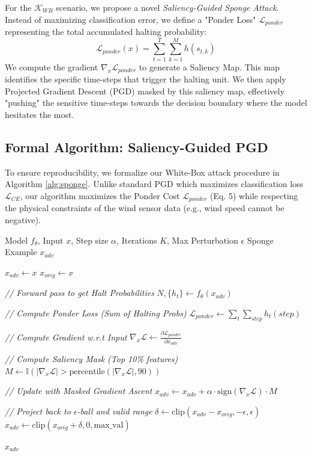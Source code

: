 \documentclass[conference]{IEEEtran}
\begin{document}
For the $\mathcal{K}_{WB}$ scenario, we propose a novel \textit{Saliency-Guided Sponge Attack}. Instead of maximizing classification error, we define a "Ponder Loss" $\mathcal{L}_{ponder}$ representing the total accumulated halting probability:
\begin{equation}
    \mathcal{L}_{ponder}(x) = \sum_{t=1}^{T} \sum_{k=1}^{M} h(s_{t,k})
\end{equation}
We compute the gradient $\nabla_x \mathcal{L}_{ponder}$ to generate a Saliency Map. This map identifies the specific time-steps that trigger the halting unit. We then apply Projected Gradient Descent (PGD) masked by this saliency map, effectively "pushing" the sensitive time-steps towards the decision boundary where the model hesitates the most.

\subsection{Formal Algorithm: Saliency-Guided PGD}
To ensure reproducibility, we formalize our White-Box attack procedure in Algorithm \ref{alg:sponge}. Unlike standard PGD which maximizes classification loss $\mathcal{L}_{CE}$, our algorithm maximizes the Ponder Cost $\mathcal{L}_{ponder}$ (Eq. 5) while respecting the physical constraints of the wind sensor data (e.g., wind speed cannot be negative).

\begin{algorithm}[h]
\caption{Saliency-Guided Sponge Attack (PGD)}
\label{alg:sponge}
\begin{algorithmic}[1]
\Require Model $f_\theta$, Input $x$, Step size $\alpha$, Iterations $K$, Max Perturbation $\epsilon$
\Ensure Sponge Example $x_{adv}$

\State $x_{adv} \leftarrow x$
\State $x_{orig} \leftarrow x$

    \State \textit{// Forward pass to get Halt Probabilities}
    \State $N, \{h_t\} \leftarrow f_\theta(x_{adv})$
    
    \State \textit{// Compute Ponder Loss (Sum of Halting Probs)}
    \State $\mathcal{L}_{ponder} \leftarrow \sum_{t} \sum_{step} h_t(step)$
    
    \State \textit{// Compute Gradient w.r.t Input}
    \State $\nabla_x \mathcal{L} \leftarrow \frac{\partial \mathcal{L}_{ponder}}{\partial x_{adv}}$
    
    \State \textit{// Compute Saliency Mask (Top 10\% features)}
    \State $M \leftarrow \mathbb{I}(|\nabla_x \mathcal{L}| > \text{percentile}(|\nabla_x \mathcal{L}|, 90))$
    
    \State \textit{// Update with Masked Gradient Ascent}
    \State $x_{adv} \leftarrow x_{adv} + \alpha \cdot \text{sign}(\nabla_x \mathcal{L}) \cdot M$
    
    \State \textit{// Project back to $\epsilon$-ball and valid range}
    \State $\delta \leftarrow \text{clip}(x_{adv} - x_{orig}, -\epsilon, \epsilon)$
    \State $x_{adv} \leftarrow \text{clip}(x_{orig} + \delta, 0, \text{max\_val})$
\EndFor

\State \Return $x_{adv}$
\end{algorithmic}
\end{algorithm}
\end{document}
